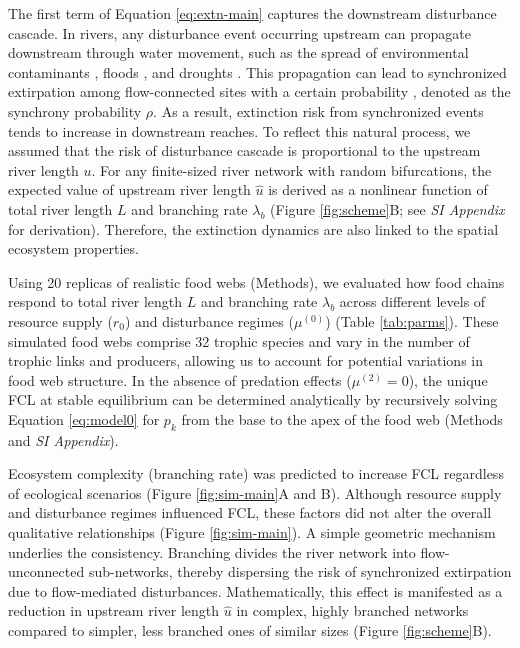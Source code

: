 \documentclass[11pt, class=article, crop=false]{standalone}
\begin{document}
The first term of Equation \ref{eq:extn-main} captures the downstream disturbance cascade.
In rivers, any disturbance event occurring upstream can propagate downstream through water movement, such as the spread of environmental contaminants \citep{massoudieh_biogeochemical_2010}, floods \citep{swanson_flood_1998, nakamura_disturbance_2000}, and droughts \citep{sarremejane_drought_2021}.
This propagation can lead to synchronized extirpation among flow-connected sites with a certain probability \citep{larsen_geography_2021, sarremejane_drought_2021}, denoted as the synchrony probability $\rho$. 
As a result, extinction risk from synchronized events tends to increase in downstream reaches.
To reflect this natural process, we assumed that the risk of disturbance cascade is proportional to the upstream river length $u$.
For any finite-sized river network with random bifurcations, the expected value of upstream river length $\hat{u}$ is derived as a nonlinear function of total river length $L$ and branching rate $\lambda_b$ (Figure \ref{fig:scheme}B; see \textit{SI Appendix} for derivation).
Therefore, the extinction dynamics are also linked to the spatial ecosystem properties.

Using 20 replicas of realistic food webs (Methods), we evaluated how food chains respond to total river length $L$ and branching rate $\lambda_b$ across different levels of resource supply ($r_0$) and disturbance regimes ($\mu^{(0)}$) (Table \ref{tab:parms}).
These simulated food webs comprise 32 trophic species and vary in the number of trophic links and producers, allowing us to account for potential variations in food web structure.
In the absence of predation effects ($\mu^{(2)} = 0$), the unique FCL at stable equilibrium can be determined analytically by recursively solving Equation \ref{eq:model0} for $p_k$ from the base to the apex of the food web (Methods and \textit{SI Appendix}).

Ecosystem complexity (branching rate) was predicted to increase FCL regardless of ecological scenarios (Figure \ref{fig:sim-main}A and B).
Although resource supply and disturbance regimes influenced FCL, these factors did not alter the overall qualitative relationships (Figure \ref{fig:sim-main}).
A simple geometric mechanism underlies the consistency.
Branching divides the river network into flow-unconnected sub-networks, thereby dispersing the risk of synchronized extirpation due to flow-mediated disturbances.
Mathematically, this effect is manifested as a reduction in upstream river length $\hat{u}$ in complex, highly branched networks compared to simpler, less branched ones of similar sizes (Figure \ref{fig:scheme}B).
\end{document}
